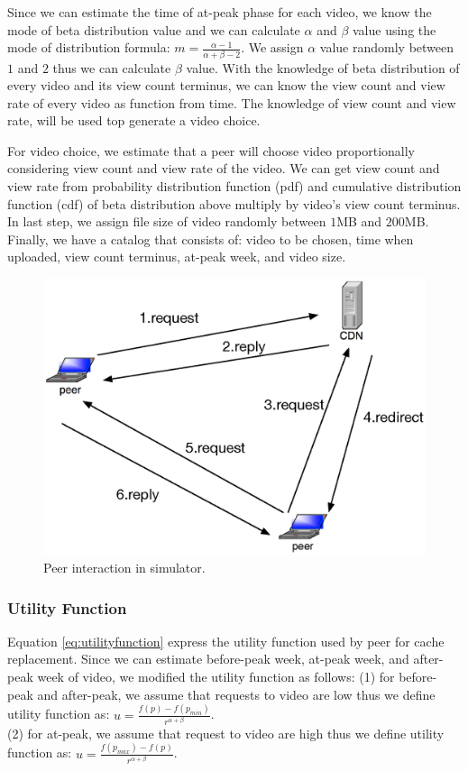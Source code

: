 \documentclass[conference]{IEEEtran}
\begin{document}
Since we can estimate the time of at-peak phase for each video, we know the mode of beta distribution value and we can calculate $\alpha$ and $\beta$ value using the mode of distribution formula: $m=\frac{\alpha-1}{\alpha + \beta - 2}$.  
We assign $\alpha$ value randomly between $1$ and $2$ thus we can calculate $\beta$ value.
With the knowledge of beta distribution of every video and its view count terminus, we can know the view count and view rate of every video as function from time.
The knowledge of view count and view rate, will be used top generate a video choice.  

For video choice, we estimate that a peer will choose video proportionally considering view count and view rate of the video.   
We can get view count and view rate from probability distribution function (pdf) and cumulative distribution function (cdf) of beta distribution above multiply by video's view count terminus.
In last step, we assign file size of video randomly between $1$MB and $200$MB.
Finally, we have a catalog that consists of: video to be chosen, time when uploaded, view count terminus, at-peak week, and video size.


\begin{figure}[th]
\begin{center}
\includegraphics[scale=0.6]{graphs/p2p-system-description.eps}
\end{center}
\caption{Peer interaction in simulator.}
\label{fig:p2pcdninteractioninsimulator}
\vspace{-2mm}
\end{figure} 


\subsubsection{Utility Function}
Equation \ref{eq:utilityfunction} express the utility function used by peer for cache replacement. 
Since we can estimate before-peak week, at-peak week, and after-peak week of video, we modified the utility function as follows: (1) for before-peak and after-peak, we assume that requests to video are low thus we define utility function as:  $u = \frac{f(p)-f(p_{min})} {r^{\alpha+\beta}}$.\\
(2) for at-peak, we assume that request to video are high thus we define utility function as:
$u = \frac{f(p_{max})-f(p)}{r^{\alpha+\beta}}$.
\end{document}
